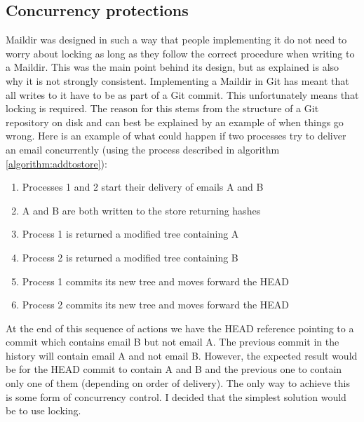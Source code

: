\subsection{Concurrency protections} \label{section:concurrency}

Maildir was designed in such a way that people implementing it do not need to worry about locking as long as they follow the correct procedure when writing to a Maildir. This was the main point behind its design, but as explained is also why it is not strongly consistent. Implementing a Maildir in Git has meant that all writes to it have to be as part of a Git commit. This unfortunately means that locking is required. The reason for this stems from the structure of a Git repository on disk and can best be explained by an example of when things go wrong. Here is an example of what could happen if two processes try to deliver an email concurrently (using the process described in algorithm \ref{algorithm:addtostore}):

\begin{enumerate}
\item Processes 1 and 2 start their delivery of emails A and B
\item A and B are both written to the store returning hashes
\item Process 1 is returned a modified tree containing A
\item Process 2 is returned a modified tree containing B
\item Process 1 commits its new tree and moves forward the HEAD
\item Process 2 commits its new tree and moves forward the HEAD
\end{enumerate}

At the end of this sequence of actions we have the HEAD reference pointing to a commit which contains email B but not email A. The previous commit in the history will contain email A and not email B. However, the expected result would be for the HEAD commit to contain A and B and the previous one to contain only one of them (depending on order of delivery). The only way to achieve this is some form of concurrency control. I decided that the simplest solution would be to use locking.

